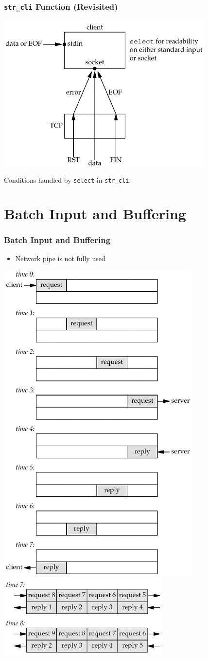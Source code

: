 \documentclass[notes,serif]{beamer}
\begin{document}
\begin{frame}
\frametitle{\texttt{str\_cli} Function (Revisited)}
  \begin{center}
  \includegraphics[width=.6\textwidth]{figs/06fig08.png}
  \end{center}
  Conditions handled by \texttt{select} in \texttt{str\_cli}.
\end{frame}

\section{Batch Input and Buffering}
\begin{frame}
\frametitle{Batch Input and Buffering}
\begin{itemize}
  \item Network pipe is not fully used
\end{itemize}
 \begin{center}
  \includegraphics[width=.3\textwidth]{figs/06fig10.png}
  \hspace{2em}
  \includegraphics[width=.6\textwidth]{figs/06fig11.png}
  \end{center}
\end{frame}
\end{document}
